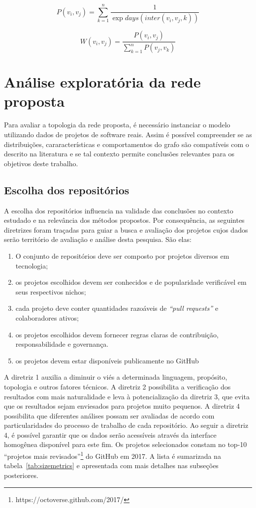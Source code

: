 \documentclass[12pt,openany,oneside,a4paper,english,brazil]{abntbibufjf}
\begin{document}
\begin{equation}
P(v_i,v_j)=\sum\limits_{k=1}^{n}\frac{1}{\exp{days(inter(v_i,v_j, k))}}\label{eq:penalization}
\end{equation}

\begin{equation}
W(v_i,v_j)=\frac{P(v_i,v_j)}{\sum\limits_{k=1}^{n}{P(v_j,v_k)}}\label{eq:weight}
\end{equation}


\section{Análise exploratória da rede proposta}
  Para avaliar a topologia da rede proposta, é necessário instanciar o modelo utilizando dados de projetos de software reais. Assim é possível compreender se as distribuições, cararacterísticas e comportamentos do grafo são compatíveis com o descrito na literatura e se tal contexto permite conclusões relevantes para os objetivos deste trabalho.
  \subsection{Escolha dos repositórios}
  A escolha dos repositórios influencia na validade das conclusões no contexto estudado e na relevância dos métodos propostos. Por consequência, as seguintes diretrizes foram traçadas para guiar a busca e avaliação dos projetos cujos dados serão território de avaliação e análise desta pesquisa. São elas:

  \begin{enumerate}
    \item O conjunto de repositórios deve ser composto por projetos diversos em tecnologia;
    \item os projetos escolhidos devem ser conhecidos e de popularidade verificável em seus respectivos nichos;
    \item cada projeto deve conter quantidades razoáveis de \textit{``pull requests''} e colaboradores ativos;
    \item os projetos escolhidos devem fornecer regras claras de contribuição, responsabilidade e governança.
    \item os projetos devem estar disponíveis publicamente no GitHub
  \end{enumerate}

  A diretriz 1 auxilia a diminuir o viés a determinada linguagem, propósito, topologia e outros fatores técnicos. A diretriz 2 possibilita a verificação dos resultados com mais naturalidade e leva à potencialização da diretriz 3, que evita que os resultados sejam enviesados para projetos muito pequenos. A diretriz 4 possibilita que diferentes análises possam ser avaliadas de acordo com particularidades do processo de trabalho de cada repositório. Ao seguir a diretriz 4, é possível garantir que os dados serão acessíveis através da interface homogênea disponível para este fim.  Os projetos selecionados constam no top-10 ``projetos mais revisados''\footnote{https://octoverse.github.com/2017/} do GitHub em 2017. A lista é  sumarizada na tabela~\ref{tab:sizemetrics} e apresentada com mais detalhes nas subseções posteriores.
\end{document}

